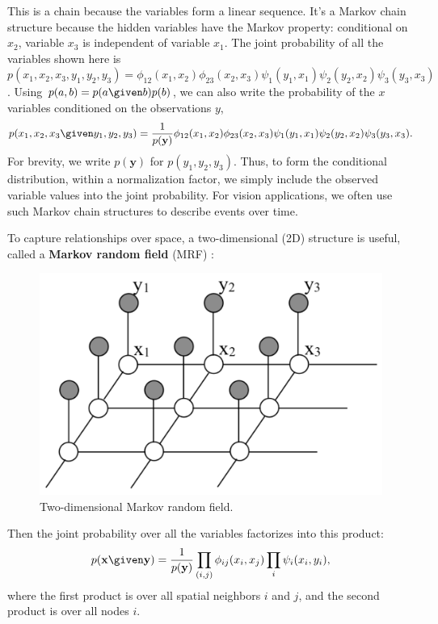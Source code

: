 This is  a chain because
the variables form a linear sequence.  It's a Markov chain structure because the
hidden variables have the Markov property:  conditional on 
 $x_2$, variable $x_3$ is independent of variable $x_1$.  The joint
probability of all the variables shown here is
$p(x_1, x_2, x_3, y_1, y_2, y_3) =  \phi_{12}(x_1, x_2)  \phi_{23}(x_2, x_3)
\psi_{1}(y_1, x_1) \psi_{2}(y_2, x_2) \psi_{3}(y_3, x_3) $.   Using
$p(a,b) = p(a \given b) p(b)$, we can
also write the probability of the $x$ variables conditioned on the
observations $y$,
\begin{equation}
p(x_1, x_2, x_3 \given y_1, y_2, y_3) =  
\frac{1}{p(\mathbf{y})} \phi_{12}(x_1, x_2)  \phi_{23}(x_2, x_3) \psi_{1}(y_1, x_1) \psi_{2}(y_2, x_2) \psi_{3}(y_3, x_3). 
\end{equation}
For brevity, we write $p(\mathbf{y})$ for $p(y_1, y_2, y_3)$.  Thus, to
form the conditional distribution, within a normalization factor, we simply include the observed variable
values into the joint probability.
For vision applications, we often use such Markov chain structures to
describe events over time.  


To capture relationships over space, a two-dimensional (2D)
structure is useful, called a {\bf Markov random field} (MRF) 
\cite{Blake2011}:
\begin{figure}
\centerline{\includegraphics[width=0.48\linewidth]{figures/graphical_models/mrf.pdf}} 
\caption{Two-dimensional Markov random field.}
\end{figure}

Then the joint probability over all the variables factorizes into this product:
\begin{equation}
p(\mathbf{x} \given \mathbf{y}) = 
\frac{1}{p(\mathbf{y})}
\prod_{(i,j)} \phi_{ij}(x_i, x_j) \prod_i \psi_i(x_i, y_i),
\end{equation}
where the first product is over all spatial neighbors $i$
and $j$, and the second product is over all nodes $i$.


